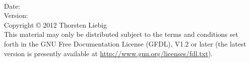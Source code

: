 \textbf{\displaytitle}\\

Date: \echodate\\
Version: \echoversion\\

Copyright © 2012 Thorsten Liebig\\
This material may only be distributed subject to the terms and conditions set forth in the GNU Free Documentation License (GFDL), V1.2 or later (the latest version is presently available at \url{http://www.gnu.org/licenses/fdl.txt}).

